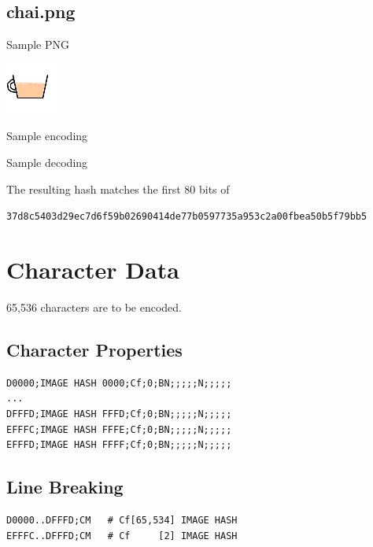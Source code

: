 \documentclass[12pt]{article}
\begin{document}


\subsection{chai.png}

Sample PNG

\includegraphics{chai.png}

Sample encoding



Sample decoding



The resulting hash matches the first 80 bits of 

\small{\texttt{37d8c5403d29ec7d6f59b02690414de77b0597735a953c2a00fbea50b5f79bb5}}

\section{Character Data}

65,536 characters are to be encoded.

\subsection{Character Properties}

\begin{verbatim}
D0000;IMAGE HASH 0000;Cf;0;BN;;;;;N;;;;;
...
DFFFD;IMAGE HASH FFFD;Cf;0;BN;;;;;N;;;;;
EFFFC;IMAGE HASH FFFE;Cf;0;BN;;;;;N;;;;;
EFFFD;IMAGE HASH FFFF;Cf;0;BN;;;;;N;;;;;
\end{verbatim}

\subsection{Line Breaking}

\begin{verbatim}
D0000..DFFFD;CM   # Cf[65,534] IMAGE HASH                                                                                                                                         
EFFFC..DFFFD;CM   # Cf     [2] IMAGE HASH                                                                                                                                         
\end{verbatim}
\end{document}
